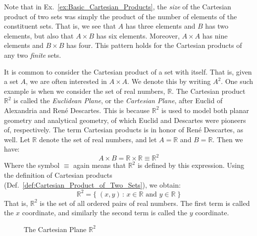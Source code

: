         Note that in Ex.~\ref{ex:Basic_Cartesian_Products}, the \textit{size}
        of the Cartesian product of two sets was simply the product of the
        number of elements of the constituent sets. That is, we see that $A$
        has three elements and $B$ has two elements, but also that
        $A\times{B}$ has six elements. Moreover, $A\times{A}$ has nine
        elements and $B\times{B}$ has four. This pattern holds for the
        Cartesian products of any two \textit{finite} sets.
        \par\hfill\par
        It is common to consider the Cartesian product of a set with itself.
        That is, given a set $A$, we are often interested in $A\times{A}$. We
        denote this by writing $A^{2}$. One such example is when we consider
        the set of real numbers, $\mathbb{R}$. The Cartesian product
        $\mathbb{R}^{2}$ is called the \textit{Euclidean Plane},
        or the \textit{Cartesian Plane}, after Euclid of Alexandria and
        Ren\'{e} Descartes. This is because $\mathbb{R}^{2}$ is used to model
        both planar geometry and analytical geometry, of which Euclid and
        Descartes were pioneers of, respectively. The term Cartesian products
        is in honor of Ren\'{e} Descartes, as well.
        Let $\mathbb{R}$ denote the set of real numbers, and let
        $A=\mathbb{R}$ and $B=\mathbb{R}$. Then we have:
        \begin{equation}
            A\times{B}=\mathbb{R}\times\mathbb{R}\equiv\mathbb{R}^{2}
        \end{equation}
        Where the symbol $\equiv$ again means that $\mathbb{R}^{2}$ is
        defined by this expression. Using the definition of Cartesian
        products (Def.~\ref{def:Cartesian_Product_of_Two_Sets}), we obtain:
        \begin{equation}
            \mathbb{R}^{2}=\{\;(x,y)\,:\,x\in\mathbb{R}
                               \textrm{ and }y\in\mathbb{R}\;\}
        \end{equation}
        That is, $\mathbb{R}^{2}$ is the set of all ordered pairs of real
        numbers. The first term is called the $x$ coordinate, and
        similarly the second term is called the $y$ coordinate.
        \begin{figure}[H]
            \centering
            
            \caption{The Cartesian Plane $\mathbb{R}^{2}$}
            \label{fig:Cartesian_Plane}
        \end{figure}
